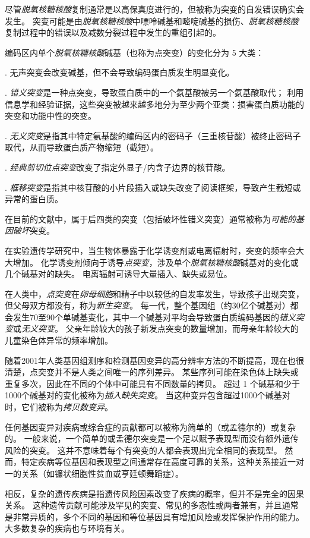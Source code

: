 \begin{proposition}[突变：遗传多样性的起源] \label{box:2_1}
	
	\quad \quad 尽管\textit{脱氧核糖核酸}复制通常是以高保真度进行的，但被称为突变的自发错误确实会发生。
	突变可能是由\textit{脱氧核糖核酸}中嘌呤碱基和嘧啶碱基的损伤、\textit{脱氧核糖核酸}复制过程中的错误以及减数分裂过程中发生的重组引起的。
	
	
	\quad \quad 编码区内单个\textit{脱氧核糖核酸}碱基（也称为点突变）的变化分为 5 大类：
	
	
	\quad {}. 无声突变会改变碱基，但不会导致编码蛋白质发生明显变化。
	
	
	\quad {}. \textit{错义突变}是一种点突变，导致蛋白质中的一个氨基酸被另一个氨基酸取代；
	利用信息学和经验证据，这些突变被越来越多地分为至少两个亚类：损害蛋白质功能的突变和功能中性的突变。
	
	
	\quad {}. \textit{无义突变}是指其中特定氨基酸的编码区内的密码子（三重核苷酸）被终止密码子取代，从而导致蛋白质产物缩短（截短）。
	
	
	\quad {}. \textit{经典剪切位点突变}改变了指定外显子/内含子边界的核苷酸。
	
	\quad {}. \textit{框移突变}是指其中核苷酸的小片段插入或缺失改变了阅读框架，导致产生截短或异常的蛋白质。
	
	\quad \quad 在目前的文献中，属于后四类的突变（包括破坏性错义突变）通常被称为\textit{可能的基因破坏}突变。
	
	\quad \quad 在实验遗传学研究中，当生物体暴露于化学诱变剂或电离辐射时，突变的频率会大大增加。
	化学诱变剂倾向于诱导\textit{点突变}，涉及单个\textit{脱氧核糖核酸}碱基对的变化或几个碱基对的缺失。
	电离辐射可诱导大量插入、缺失或易位。
	
	\quad \quad 在人类中，\textit{点突变}在\textit{卵母细胞}和精子中以较低的自发率发生，导致孩子出现突变，但父母双方都没有，称为\textit{新生突变}。
	每一代，整个基因组（约30亿个碱基对）都会发生70至90个单碱基变化，其中一个碱基对平均会导致蛋白质编码基因的\textit{错义突变}或\textit{无义突变}。
	父亲年龄较大的孩子新发点突变的数量增加，而母亲年龄较大的儿童染色体异常的频率增加。
	
	
	\quad \quad 随着2001年人类基因组测序和检测基因变异的高分辨率方法的不断提高，现在也很清楚，点突变并不是人类之间唯一的序列差异。
	某些序列可能在染色体上缺失或重复多次，因此在不同的个体中可能具有不同数量的拷贝。
	超过 1 个碱基和少于1000个碱基对的变化被称为\textit{插入缺失突变}。
	当这种变异包含超过1000个碱基对时，它们被称为\textit{拷贝数变异}。
	
	
	\quad \quad 任何基因变异对疾病或综合症的贡献都可以被称为简单的（或孟德尔的）或复杂的。
	一般来说，一个简单的或孟德尔突变是一个足以赋予表现型而没有额外遗传风险的突变。
	这并不意味着每个有突变的人都会表现出完全相同的表现型。
	然而，特定疾病等位基因和表现型之间通常存在高度可靠的关系，这种关系接近一对一的关系（如镰状细胞性贫血或亨廷顿舞蹈症）。
	
	
	\quad \quad 相反，复杂的遗传疾病是指遗传风险因素改变了疾病的概率，但并不是完全的因果关系。
	这种遗传贡献可能涉及罕见的突变、常见的多态性或两者兼有，并且通常是非常异质的，多个不同的基因和等位基因具有增加风险或发挥保护作用的能力。
	大多数复杂的疾病也与环境有关。
	
		
\end{proposition}

